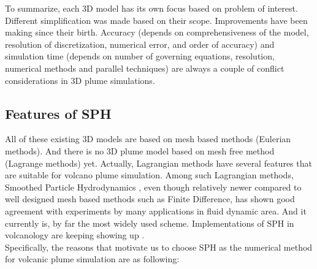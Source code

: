 \documentclass[journal abbreviation, manuscript]{copernicus}
\begin{document}
To summarize, each 3D model has its own focus based on problem of interest. Different simplification was made based on their scope. Improvements have been making since their birth. Accuracy (depends on comprehensiveness of the model, resolution of discretization, numerical error, and order of accuracy) and simulation time (depends on number of governing equations, resolution, numerical methods and parallel techniques) are always a couple of conflict considerations in 3D plume simulations.\\
%
\subsection{Features of SPH}
All of these existing 3D models are based on mesh based methods (Eulerian methods). And there is no 3D plume model based on mesh free method (Lagrange methods) yet. Actually, Lagrangian methods have several features that are suitable for volcano plume simulation. Among such Lagrangian methods, Smoothed Particle Hydrodynamics \citep{gingold1977smoothed,lucy1977numerical}, even though relatively newer compared to well designed mesh based methods such as Finite Difference, has shown good agreement with experiments by many applications in fluid dynamic area. And it currently is, by far the most widely used scheme. Implementations of SPH in volcanology are keeping showing up \citep{bursik2003smoothed,herault2010sph,haddad2016smoothed}.\\
Specifically, the reasons that motivate us to choose SPH as the numerical method for volcanic plume simulation are as following:
\end{document}
